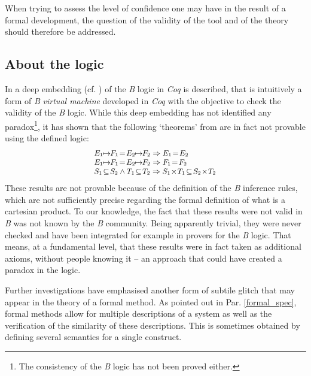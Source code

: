 \documentclass[conference]{IEEEtran}
\begin{document}
When trying to assess the level of confidence one may have in the result of a formal
development, the question of the validity of the tool and of the theory should therefore be
addressed.

\subsection{About the logic}\label{logic_error}

In \cite{DBLP:conf/lpar/JaegerD07} a deep embedding (cf. \cite{gor:2,azu:1}) of the \emph{B}
logic in \emph{Coq} is described, that is intuitively a form of \emph{B}
\emph{virtual machine} developed in \emph{Coq} with the objective to check the validity of
the \emph{B} logic. While this deep embedding has not identified any paradox\footnote{The
consistency of the \emph{B} logic has not been proved either.}, it has shown that the
following `theorems' from \cite{abr:1} are in fact not provable using the defined logic:
\[\small\begin{array}{l}
E_1\!\!\mapsto\!\!F_1\!=\!E_2\!\!\mapsto\!\!F_2\Rightarrow E_1\!=\!E_2\\
E_1\!\!\mapsto\!\!F_1\!=\!E_2\!\!\mapsto\!\!F_2\Rightarrow F_1\!=\!F_2\\
S_1\!\subseteq\!S_2 \land T_1\!\subseteq\!T_2 \Rightarrow
S_1\!\times\!T_1\!\subseteq\!S_2\!\times\!T_2
\end{array}\]
These results are not provable because of the definition of the \emph{B} inference rules,
which are not sufficiently precise regarding the formal definition of what is a cartesian
product. To our knowledge, the fact that these results were not valid in \emph{B} was not
known by the \emph{B} community. Being apparently trivial, they were never checked and have
been integrated for example in provers for the \emph{B} logic. That means, at a fundamental
level, that these results were in fact taken as additional axioms, without people knowing it
-- an approach that could have created a paradox in the logic.

Further investigations have emphasised another form of subtile glitch that may appear in the
theory of a formal method. As pointed out  in Par. \ref{formal_spec}, formal methods allow for
multiple descriptions of a system as well as the verification of the similarity of these
descriptions. This is sometimes obtained by defining several semantics for a single construct.
\end{document}

